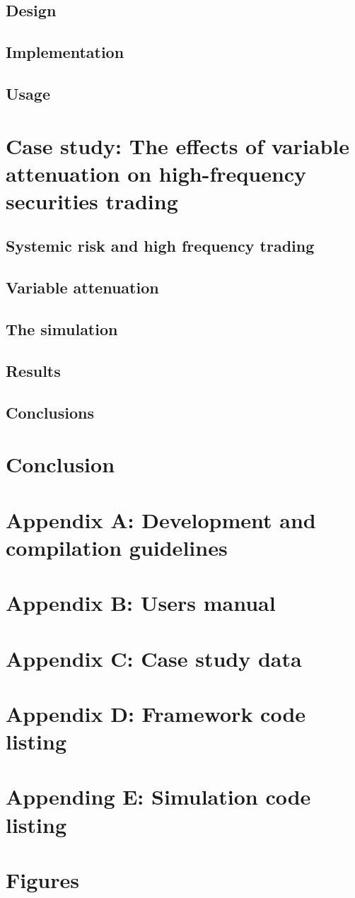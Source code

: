 \documentclass[a4paper, 11pt]{article}
\let\stdsection\section
\renewcommand\section{\newpage\stdsection}
\begin{document}
\subsection{Design}
\subsection{Implementation}
\subsection{Usage}
\section{Case study: The effects of variable attenuation on high-frequency securities trading}
  \subsection{Systemic risk and high frequency trading}
  \subsection{Variable attenuation}
  \subsection{The simulation}
  \subsection{Results}
  \subsection{Conclusions}
\section{Conclusion}
\section{Appendix A: Development and compilation guidelines}
\section{Appendix B: Users manual}
\section{Appendix C: Case study data}
\section{Appendix D: Framework code listing}
\section{Appending E: Simulation code listing}
\section{Figures}

\end{document}
